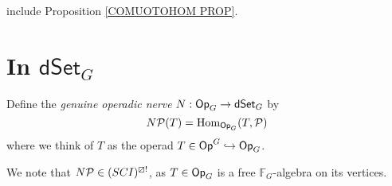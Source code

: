 \documentclass[a4paper,10pt
,draft
]{article}%
\renewcommand{\1}{\eta}%
\begin{document}
{\color{red} include Proposition \ref{COMUOTOHOM PROP}.}













\newpage

\section{In $\mathsf{dSet}_G$}

\begin{definition}
      Define the \textit{genuine operadic nerve} $N: \Op_G \to \dSet_G$ by
      \begin{equation}
            N\P(T) = \Hom_{\Op_G}(T, \P)
      \end{equation}
      where we think of $T$ as the operad $T \in \Op^G \into \Op_G$. 
\end{definition}

\begin{remark}
      We note that $N\P \in (SCI)^{\boxslash !}$,
      as $T \in \Op_G$ is a free $\mathbb F_G$-algebra on its vertices.
\end{remark}
\end{document}
